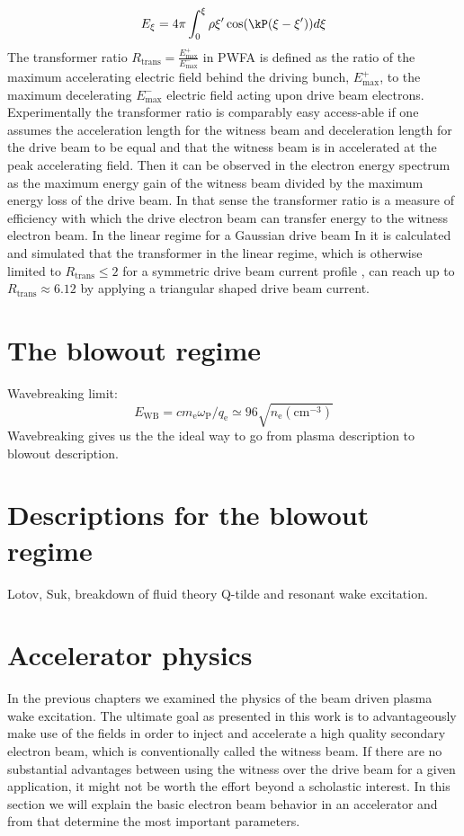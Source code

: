 \begin{equation}
E_\xi=4\pi \int_0^\xi \rho{\xi'}\cos(\kP(\xi-\xi'))d\xi
\end{equation}
The transformer ratio $R_\mathrm{trans}=\frac{E_\mathrm{max}^+}{E_\mathrm{max}^-} $ in PWFA is defined as
the ratio of the maximum accelerating electric field
behind the driving bunch, $E_\mathrm{max}^+$, to the maximum decelerating $E_\mathrm{max}^-$
electric field acting upon drive beam electrons. Experimentally the transformer ratio is comparably easy access-able if one assumes the acceleration length for the witness beam and deceleration length for the drive beam to be equal and that the  witness beam is in accelerated at the peak accelerating field.
Then it can be observed in the electron energy spectrum as the maximum energy gain of the witness beam divided by the maximum energy loss of the drive beam. In that sense the transformer ratio is a measure of efficiency with which the drive electron beam can transfer energy to the witness electron beam. 
In the linear regime for a Gaussian drive beam 
In \cite{PhysRevLett.56.1252} it is calculated and simulated that the transformer in the linear regime, which is otherwise limited to $R_\mathrm{trans}\leq 2$ for a symmetric drive beam current profile \cite{bane1984wake}, can reach up to $R_\mathrm{trans}\approx 6.12$ by applying a triangular shaped drive beam current.
\section{The blowout regime}
\label{sec:Blowout_regime}


Wavebreaking limit: \begin{equation}
E_\mathrm{WB}=cm_\mathrm{e}\omega_\mathrm{P}/q_\mathrm{e}\simeq 96 \sqrt{n_\mathrm{e}(\mathrm{cm}^{-3})}
\end{equation}
Wavebreaking gives us the the ideal way to go from plasma description to blowout description.

\section{Descriptions for the blowout regime}
Lotov, Suk, breakdown of fluid theory
Q-tilde and resonant wake excitation.


\section{Accelerator physics}
In the previous chapters we examined the physics of the beam driven plasma wake excitation. 
The ultimate goal as presented in this work is to advantageously make use of the fields in order to inject and accelerate a high quality secondary electron beam, which is conventionally called the witness beam. If there are no substantial advantages between  using the witness over the drive beam for a given application, it might not be worth the effort beyond a scholastic interest.
In this section we will explain the basic electron beam behavior in an accelerator and from that determine the most important parameters. 
